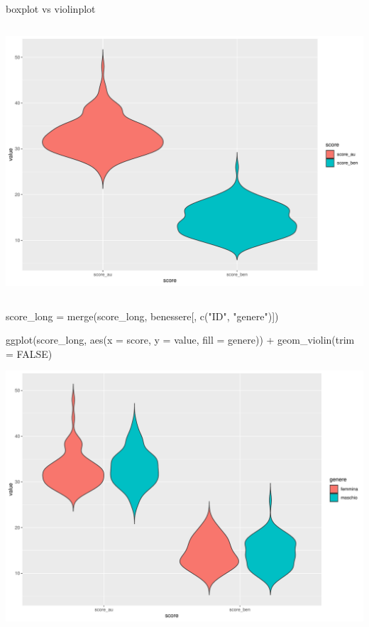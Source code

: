 \documentclass[
  ignorenonframetext,
]{beamer}
\newenvironment{Shaded}{\begin{snugshade}}{\end{snugshade}}
\newcommand{\AttributeTok}[1]{\textcolor[rgb]{0.00,0.34,0.68}{#1}}
\newcommand{\ConstantTok}[1]{\textcolor[rgb]{0.67,0.33,0.00}{#1}}
\newcommand{\FunctionTok}[1]{\textcolor[rgb]{0.39,0.29,0.61}{#1}}
\newcommand{\NormalTok}[1]{\textcolor[rgb]{0.12,0.11,0.11}{#1}}
\newcommand{\OtherTok}[1]{\textcolor[rgb]{0.00,0.43,0.16}{#1}}
\newcommand{\SpecialCharTok}[1]{\textcolor[rgb]{0.24,0.68,0.91}{#1}}
\newcommand{\StringTok}[1]{\textcolor[rgb]{0.75,0.01,0.01}{#1}}
\begin{document}
\begin{frame}[fragile]{boxplot vs violinplot}
\begin{columns}[T]
\begin{column}{0.48\textwidth}
\begin{center}\includegraphics[width=0.7\linewidth]{Practice_files/figure-beamer/unnamed-chunk-77-1} \end{center}
\end{column}
\end{columns}
\end{frame}

\begin{frame}[fragile]{}
\protect\hypertarget{section-8}{}
\footnotesize

\begin{Shaded}
\begin{Highlighting}[]
\NormalTok{score\_long }\OtherTok{=} \FunctionTok{merge}\NormalTok{(score\_long, benessere[, }\FunctionTok{c}\NormalTok{(}\StringTok{"ID"}\NormalTok{, }\StringTok{"genere"}\NormalTok{)])}

\FunctionTok{ggplot}\NormalTok{(score\_long, }
       \FunctionTok{aes}\NormalTok{(}\AttributeTok{x =}\NormalTok{ score, }\AttributeTok{y =}\NormalTok{ value,}
           \AttributeTok{fill =}\NormalTok{ genere)) }\SpecialCharTok{+} \FunctionTok{geom\_violin}\NormalTok{(}\AttributeTok{trim =} \ConstantTok{FALSE}\NormalTok{) }
\end{Highlighting}
\end{Shaded}

\begin{center}\includegraphics[width=0.7\linewidth]{Practice_files/figure-beamer/unnamed-chunk-78-1} \end{center}
\end{frame}
\end{document}
